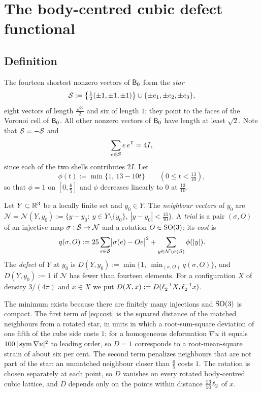 \section{The body-centred cubic defect functional}\label{sec:defect}

\subsection{Definition}\label{ssec:Ddef}

The fourteen shortest nonzero vectors of $\mathsf B_0$ form the \emph{star}
\[
  \mathcal S:=\bigl\{\tfrac12(\pm1,\pm1,\pm1)\bigr\}\cup\{\pm e_1,\pm e_2,\pm e_3\},
\]
eight vectors of length $\frac{\sqrt3}2$ and six of length $1$; they point to the faces of the Voronoi cell of $\mathsf B_0$. All other nonzero
vectors of $\mathsf B_0$ have length at least $\sqrt2$. Note that $\mathcal S=-\mathcal S$ and
\begin{equation}\label{eq:starmoment}
  \sum_{e\in\mathcal S}e\,e^\mathsf T=4I ,
\end{equation}
since each of the two shells contributes $2I$. Let
\begin{equation}\label{eq:phi}
  \phi(t):=\min\{1,\,13-10t\}\qquad(0\le t<\tfrac{13}{10}),
\end{equation}
so that $\phi=1$ on $[0,\frac65]$ and $\phi$ decreases linearly to $0$ at $\frac{13}{10}$.

\begin{definition}[Defect]\label{def:D}
Let $Y\subset\mathbb R^3$ be a locally finite set and $y_0\in Y$. The \emph{neighbour vectors} of $y_0$ are
$\mathcal N=\mathcal N(Y,y_0):=\{y-y_0:\ y\in Y\setminus\{y_0\},\ |y-y_0|<\frac{13}{10}\}$. A \emph{trial} is a pair $(\sigma,O)$ of an
injective map $\sigma:\mathcal S\to\mathcal N$ and a rotation $O\in\mathrm{SO}(3)$; its \emph{cost} is
\begin{equation}\label{eq:cost}
  q(\sigma,O):=25\sum_{e\in\mathcal S}\bigl|\sigma(e)-Oe\bigr|^2+\sum_{y\in\mathcal N\setminus\sigma(\mathcal S)}\phi(|y|).
\end{equation}
The \emph{defect} of $Y$ at $y_0$ is $D(Y,y_0):=\min\{1,\ \min_{(\sigma,O)}q(\sigma,O)\}$, and $D(Y,y_0):=1$ if $\mathcal N$ has fewer
than fourteen elements. For a configuration $X$ of density $3/(4\pi)$ and $x\in X$ we put
$D(X,x):=D(\ell_2^{-1}X,\ell_2^{-1}x)$.
\end{definition}

The minimum exists because there are finitely many injections and $\mathrm{SO}(3)$ is compact. The first term of \eqref{eq:cost} is the squared
distance of the matched neighbours from a rotated star, in units in which a root-sum-square deviation of one fifth of the cube side
costs $1$; for a homogeneous deformation $\nabla u$ it equals $100\,|\operatorname{sym}\nabla u|^2$ to leading order, so $D=1$ corresponds to a
root-mean-square strain of about six per cent. The second term penalizes neighbours that are not part of the star: an unmatched
neighbour closer than $\frac65$ costs $1$. The rotation is chosen separately at each point, so $D$ vanishes on every rotated
body-centred cubic lattice, and $D$ depends only on the points within distance $\frac{13}{10}\ell_2$ of $x$.

